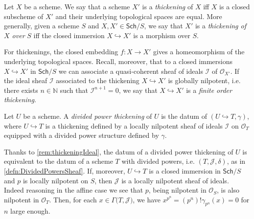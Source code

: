 \begin{defn}[Thickening]
	Let $X$ be a scheme.
	We say that a scheme $X'$ is a \emph{thickening} of $X$ iff
	$X$ is a closed subscheme of $X'$ and their underlying topological
	spaces are equal.
	More generally, given a scheme $S$ and $X, X' \in \mathsf{Sch}/S$,
	we say that $X'$ is a \emph{thickening of $X$ over} $S$ iff
	the closed immersion $X \hookrightarrow X'$ is a morphism over $S$.
\end{defn}


\begin{rem}[]\label{rem:thickeningIdeal}
	For thickenings, the closed embedding $f\colon X \to X'$ gives a homeomorphism
	of the underlying topological spaces.
	Recall, moreover, that to a closed immersions 
	$X \hookrightarrow X'$ in $\mathsf{Sch}/S$
	we can associate a quasi-coherent sheaf of ideals
	$\mathcal{I}$ of $\mathcal{O}_{ X' }$.
	If the ideal sheaf $\mathcal{I}$ associated to the thickening
	$X \hookrightarrow X'$ is globally nilpotent, i.e. there exists $n \in \mathbb{N}$
	such that $\mathcal{I}^{n+1} = 0$, we say that $X \hookrightarrow X'$ 
	is a \emph{finite order thickening}.
\end{rem}


\begin{defn}\label{defn:PDThickening}
	Let $U$ be a scheme. A \emph{divided power thickening} of $U$ 
	is the datum of $\left(U \hookrightarrow T, \gamma\right)$,
	where $U \hookrightarrow T$ is a thickening defined by a locally nilpotent
	sheaf of ideals $\mathcal{I}$ on $\mathcal{O}_T$ equipped
	with a divided power structure defined by $\gamma$.
\end{defn}


\begin{rem}[]\label{rem:EquivPDThickening}
	Thanks to \cref{rem:thickeningIdeal}, the datum of a
	divided power thickening of $U$ is equivalent to the datum of
	a scheme $T$ with divided powers, i.e.
	$\left(T, \mathcal{J}, \delta\right)$, as in \cref{defn:DividedPowersSheaf}.
	If, moreover, \(U \hookrightarrow T\) is a closed immersion
	in \(\mathsf{Sch}/ S \) and \(p\) is locally nilpotent on \(S\),
	then $\mathcal{J}$ is a locally nilpotent sheaf of ideals.
	Indeed reasoning in the affine case we see that \(p\),
	being nilpotent in \(\mathcal{O}_{ S }\), is also nilpotent
	in \(\mathcal{O}_T\).
	Then, for each \(x \in \Gamma(T,\mathcal{J)}\),
	we have \(x^{ p^n } = (p^n)! \gamma_{ p^n }(x) = 0\)
	for \(n\) large enough.
\end{rem}


